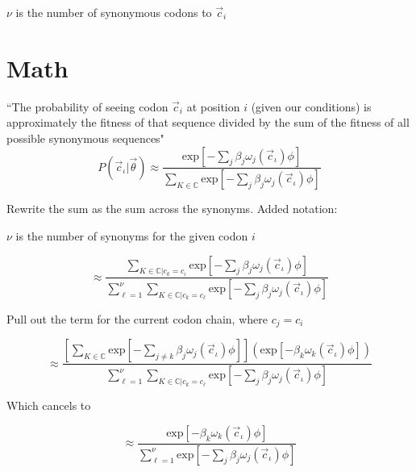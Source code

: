 \documentclass[11pt]{article} %
\begin{document}
$\nu$ is the number of synonymous codons to $\vec{c}_i$

\section{Math}

``The probability of seeing codon $\vec{c}_i$ at position $i$ (given our conditions) is approximately the fitness of that sequence divided by the sum of the fitness of all possible synonymous sequences"
\[
P(\vec{c}_\iota | \vec{\theta}) \approx
\frac{
\mbox{exp}\left[-\sum_{j} \beta_j \omega_j (\vec{c}_\iota) \phi \right]
}{
\sum _{K \in \mathbb{C}}
\mbox{exp}\left[-\sum_j \beta_j \omega_j (\vec{c}_\iota) \phi \right]
}
\]


Rewrite the sum as the sum across the synonyms.
Added notation: 

$\nu$ is the number of synonyms for the given codon $i$

\[
\approx
\frac{
\sum _{K \in \mathbb{C} | c_k = c_\iota}
\mbox{exp}\left[-\sum_{j} \beta_j \omega_j (\vec{c}_\iota) \phi \right]
}{
\sum_{\ell=1}^\nu
\sum _{K \in \mathbb{C} | c_k = c_\ell}
\mbox{exp}\left[-\sum_j \beta_j \omega_j (\vec{c}_\iota) \phi \right]
}
\]

Pull out the term for the current codon chain, where $c_j=c_i$

\[
\approx
\frac{
\left[
\sum _{K \in \mathbb{C}}
\mbox{exp}\left[-\sum_{j\neq k} \beta_j \omega_j (\vec{c}_\iota) \phi \right]
\right]
\left(\mbox{exp}\left[-\beta_k \omega_k (\vec{c}_\iota) \phi \right]\right)
}{
\sum_{\ell=1}^\nu
\sum _{K \in \mathbb{C} | c_k = c_\ell}
\mbox{exp}\left[-\sum_j \beta_j \omega_j (\vec{c}_\iota) \phi \right]
}
\]


Which cancels to


\[
\approx
\frac{
\mbox{exp}\left[-\beta_k \omega_k (\vec{c}_\iota) \phi \right]
}{
\sum_{\ell=1}^\nu
\mbox{exp}\left[-\sum_j \beta_j \omega_j (\vec{c}_\iota) \phi \right]
}
\]
\end{document}
